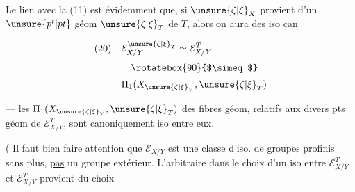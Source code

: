 
Le lien avec la  (11) est évidemment que, si $\unsure{\zeta|\xi}_X$ provient d'un $\unsure{p^t|pt}$ géom $\unsure{\zeta|\xi}_T$ de $T$, alors on aura des iso can

\[
\begin{aligned}
(20)\quad &\mathcal E_{X/Y}^{\unsure{\zeta|\xi}_T}\simeq\mathcal E_{X/Y}^T\\[0.5ex]
&\quad\rotatebox{90}{$\simeq$}\\[0.5ex]
&\Pi_1(X_{\unsure{\zeta|\xi}_Y},\unsure{\zeta|\xi}_T)
\end{aligned}
\]

 --- les $\Pi_1(X_{\unsure{\zeta|\xi}_Y},\unsure{\zeta|\xi}_T)$ des fibres géom, relatifs aux divers pts géom de $\mathcal E_{X/Y}^T$, sont canoniquement iso entre eux.

( Il faut bien faire attention que $\mathcal E_{X/Y}$  est une classe d'iso. de groupes profinis sans plus, \uline{pas} un groupe extérieur. L'arbitraire dans le choix d'un iso entre $\mathcal E_{X/Y}^T$ et $\mathcal E_{X/Y}^{T'}$ provient du choix

